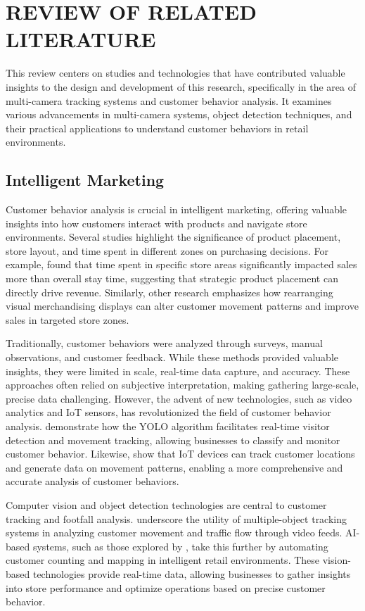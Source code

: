 \chapter{REVIEW OF RELATED LITERATURE}
{\baselineskip
This review centers on studies and technologies that have contributed valuable insights to the design and development of this research, specifically in the area of multi-camera tracking systems and customer behavior analysis. It examines various advancements in multi-camera systems, object detection techniques, and their practical applications to understand customer behaviors in retail environments.
\section{Intelligent Marketing}
Customer behavior analysis is crucial in intelligent marketing, offering valuable insights into how customers interact with products and navigate store environments. Several studies highlight the significance of product placement, store layout, and time spent in different zones on purchasing decisions. For example, \cite{Kim2019} found that time spent in specific store areas significantly impacted sales more than overall stay time, suggesting that strategic product placement can directly drive revenue. Similarly, other research emphasizes how rearranging visual merchandising displays can alter customer movement patterns and improve sales in targeted store zones.

Traditionally, customer behaviors were analyzed through surveys, manual observations, and customer feedback. While these methods provided valuable insights, they were limited in scale, real-time data capture, and accuracy. These approaches often relied on subjective interpretation, making gathering large-scale, precise data challenging. However, the advent of new technologies, such as video analytics and IoT sensors, has revolutionized the field of customer behavior analysis. \cite{Erlina2023} demonstrate how the YOLO algorithm facilitates real-time visitor detection and movement tracking, allowing businesses to classify and monitor customer behavior. Likewise, \cite{Kim2019} show that IoT devices can track customer locations and generate data on movement patterns, enabling a more comprehensive and accurate analysis of customer behaviors.

Computer vision and object detection technologies are central to customer tracking and footfall analysis. \cite{Cobos2019} underscore the utility of multiple-object tracking systems in analyzing customer movement and traffic flow through video feeds. AI-based systems, such as those explored by \cite{Cabahug2023}, take this further by automating customer counting and mapping in intelligent retail environments. These vision-based technologies provide real-time data, allowing businesses to gather insights into store performance and optimize operations based on precise customer behavior.

}
